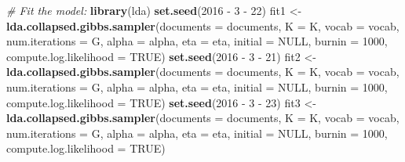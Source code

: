 \documentclass[12pt,]{article}
\newenvironment{Shaded}{\begin{snugshade}}{\end{snugshade}}
\newcommand{\KeywordTok}[1]{\textcolor[rgb]{0.13,0.29,0.53}{\textbf{{#1}}}}
\newcommand{\DataTypeTok}[1]{\textcolor[rgb]{0.13,0.29,0.53}{{#1}}}
\newcommand{\DecValTok}[1]{\textcolor[rgb]{0.00,0.00,0.81}{{#1}}}
\newcommand{\StringTok}[1]{\textcolor[rgb]{0.31,0.60,0.02}{{#1}}}
\newcommand{\CommentTok}[1]{\textcolor[rgb]{0.56,0.35,0.01}{\textit{{#1}}}}
\newcommand{\OtherTok}[1]{\textcolor[rgb]{0.56,0.35,0.01}{{#1}}}
\newcommand{\NormalTok}[1]{{#1}}
\begin{document}
\begin{Shaded}
\begin{Highlighting}[]
{{{{{{{{{{{\CommentTok{# Fit the model:}
\KeywordTok{library}\NormalTok{(lda)}
\KeywordTok{set.seed}\NormalTok{(}\DecValTok{2016} \NormalTok{-}\StringTok{ }\DecValTok{3} \NormalTok{-}\StringTok{ }\DecValTok{22}\NormalTok{)}
\NormalTok{fit1 <-}\StringTok{ }\KeywordTok{lda.collapsed.gibbs.sampler}\NormalTok{(}\DataTypeTok{documents =} \NormalTok{documents, }\DataTypeTok{K =} \NormalTok{K, }\DataTypeTok{vocab =} \NormalTok{vocab, }
    \DataTypeTok{num.iterations =} \NormalTok{G, }\DataTypeTok{alpha =} \NormalTok{alpha, }\DataTypeTok{eta =} \NormalTok{eta, }\DataTypeTok{initial =} \OtherTok{NULL}\NormalTok{, }\DataTypeTok{burnin =} \DecValTok{1000}\NormalTok{, }
    \DataTypeTok{compute.log.likelihood =} \OtherTok{TRUE}\NormalTok{)}
\KeywordTok{set.seed}\NormalTok{(}\DecValTok{2016} \NormalTok{-}\StringTok{ }\DecValTok{3} \NormalTok{-}\StringTok{ }\DecValTok{21}\NormalTok{)}
\NormalTok{fit2 <-}\StringTok{ }\KeywordTok{lda.collapsed.gibbs.sampler}\NormalTok{(}\DataTypeTok{documents =} \NormalTok{documents, }\DataTypeTok{K =} \NormalTok{K, }\DataTypeTok{vocab =} \NormalTok{vocab, }
    \DataTypeTok{num.iterations =} \NormalTok{G, }\DataTypeTok{alpha =} \NormalTok{alpha, }\DataTypeTok{eta =} \NormalTok{eta, }\DataTypeTok{initial =} \OtherTok{NULL}\NormalTok{, }\DataTypeTok{burnin =} \DecValTok{1000}\NormalTok{, }
    \DataTypeTok{compute.log.likelihood =} \OtherTok{TRUE}\NormalTok{)}
\KeywordTok{set.seed}\NormalTok{(}\DecValTok{2016} \NormalTok{-}\StringTok{ }\DecValTok{3} \NormalTok{-}\StringTok{ }\DecValTok{23}\NormalTok{)}
\NormalTok{fit3 <-}\StringTok{ }\KeywordTok{lda.collapsed.gibbs.sampler}\NormalTok{(}\DataTypeTok{documents =} \NormalTok{documents, }\DataTypeTok{K =} \NormalTok{K, }\DataTypeTok{vocab =} \NormalTok{vocab, }
    \DataTypeTok{num.iterations =} \NormalTok{G, }\DataTypeTok{alpha =} \NormalTok{alpha, }\DataTypeTok{eta =} \NormalTok{eta, }\DataTypeTok{initial =} \OtherTok{NULL}\NormalTok{, }\DataTypeTok{burnin =} \DecValTok{1000}\NormalTok{, }
    \DataTypeTok{compute.log.likelihood =} \OtherTok{TRUE}\NormalTok{)}

}}}}}}}}}}}
\end{Highlighting}
\end{Shaded}
\end{document}
